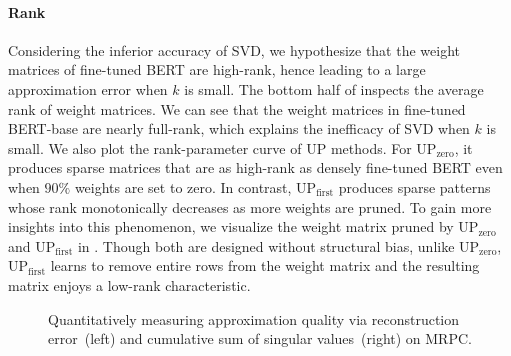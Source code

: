 \paragraph{Rank} 
Considering the inferior accuracy of SVD, we hypothesize that the weight matrices of fine-tuned BERT are high-rank, 
hence leading to a large approximation error when $k$ is small. The bottom half of  inspects the average rank of weight matrices. We can see that the weight matrices in fine-tuned BERT-base are nearly full-rank, which explains the inefficacy of SVD when $k$ is small. We also plot the rank-parameter curve of UP methods. For UP$_\text{zero}$, it produces sparse matrices that are 
as high-rank as densely fine-tuned BERT even when $90\%$ weights are set to zero. In contrast, UP$_\text{first}$  produces sparse patterns whose rank monotonically decreases as more weights are pruned. To gain more insights into this phenomenon, we visualize the weight matrix pruned by UP$_\text{zero}$ and UP$_\text{first}$ in . Though both are designed without structural bias,  unlike UP$_\text{zero}$, UP$_\text{first}$ learns to remove entire rows from the weight matrix and 
the resulting matrix enjoys a low-rank characteristic.



\begin{figure}[th]
	\centering
	\caption{Quantitatively measuring approximation quality via reconstruction error~(left) and cumulative sum of singular values~(right) on MRPC.}
	\label{fig:norm}
\end{figure}

